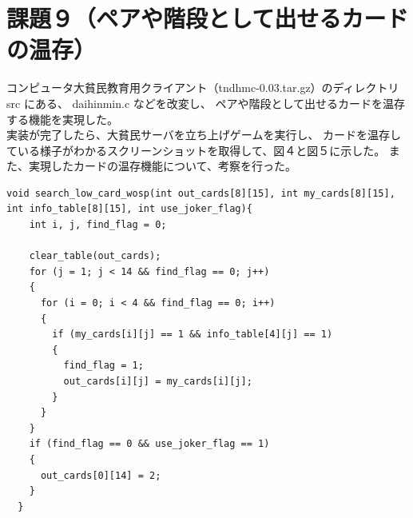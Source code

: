 \documentclass[]{jsarticle}
\begin{document}
\newpage
\section{課題９（ペアや階段として出せるカードの温存）}
コンピュータ大貧民教育用クライアント（tndhmc-0.03.tar.gz）のディレクトリ src にある、 daihinmin.c などを改変し、
ペアや階段として出せるカードを温存する機能を実現した。\\

実装が完了したら、大貧民サーバを立ち上げゲームを実行し、 カードを温存している様子がわかるスクリーンショットを取得して、図４と図５に示した。
また、実現したカードの温存機能について、考察を行った。

\begin{lstlisting}[caption={daihinmin.c}]
  void search_low_card_wosp(int out_cards[8][15], int my_cards[8][15], int info_table[8][15], int use_joker_flag){
    int i, j, find_flag = 0;
  
    clear_table(out_cards);
    for (j = 1; j < 14 && find_flag == 0; j++)
    {
      for (i = 0; i < 4 && find_flag == 0; i++)
      {
        if (my_cards[i][j] == 1 && info_table[4][j] == 1)
        {
          find_flag = 1;
          out_cards[i][j] = my_cards[i][j];
        }
      }
    }
    if (find_flag == 0 && use_joker_flag == 1)
    {
      out_cards[0][14] = 2;
    }
  }
\end{lstlisting}
\end{document}
